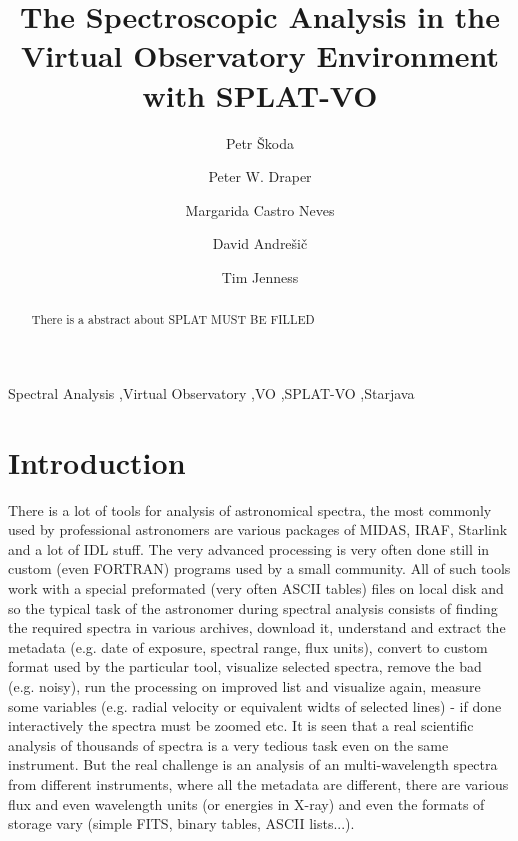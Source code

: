 \documentclass[final,authoryear,5p,times,twocolumn]{elsarticle}
\begin{document}
\begin{frontmatter}

\title{The Spectroscopic Analysis in the Virtual Observatory Environment with SPLAT-VO}

\author[OND]{Petr \v{S}koda}
\author[DUR]{Peter W. Draper}
\author[HDB]{Margarida Castro Neves}
\author[VSB]{David Andre\v{s}i\v{c}}
\author[COR]{Tim Jenness}

\address[OND]{Astronomical Institute of the Academy of Sciences,Fri\v{c}ova~298, 251\,65, Ond\v{r}ejov, Czech Republic}
\address[DUR]{Department of Physics, Institute for Computational
Cosmology, University of Durham, South Road, Durham DH1 3LE, UK}
\address[HDB]{Universit\"a{}t Hyeidelberg, Astronomisches Rechen-Institut,
M\"o{}nchhofstra\ss{}e 12--14, 69120 Heidelberg, Germany}
\address[VSB]{Department of Computer Science, Faculty of Electrical
Engineering and Computer Science, V\v{S}B --- Technical University of Ostrava, 17. listopadu 15, 708 33 Ostrava-Poruba, Czech Republic}
\address[COR]{Department of Astronomy, Cornell University, Ithaca, NY 14853, USA}


\begin{abstract}
There is a abstract about SPLAT
MUST BE FILLED
\end{abstract}
\begin{keyword}
Spectral Analysis \sep Virtual Observatory \sep VO \sep SPLAT-VO \sep Starjava
\end{keyword}
\end{frontmatter}
\section{Introduction}

There is a lot of tools for analysis of astronomical spectra, the most commonly
used by professional astronomers are various packages of MIDAS, IRAF, Starlink and a lot
of IDL stuff. The very advanced processing is very often done still in custom
(even FORTRAN) programs used by a small community.  All of such tools work with
a special preformated (very often ASCII tables)  files on local disk and so the
typical task of the astronomer during spectral analysis consists of finding the
required spectra in various archives, download it, understand and extract the
metadata (e.g. date of exposure, spectral range, flux units),  convert to
custom format used by the particular tool, visualize selected spectra, remove
the bad (e.g. noisy), run the processing on improved list and visualize again,
measure some variables (e.g. radial velocity or equivalent widts of selected
lines) - if done interactively the spectra must be zoomed etc.  It is seen that
a real scientific analysis of thousands of spectra is a very tedious task even
on the same instrument. But the real challenge is an analysis of an
multi-wavelength spectra from different instruments, where all the metadata are
different, there are various flux and even wavelength units (or energies in
X-ray) and even the formats of storage vary (simple FITS, binary tables, ASCII
lists...).
\end{document}
